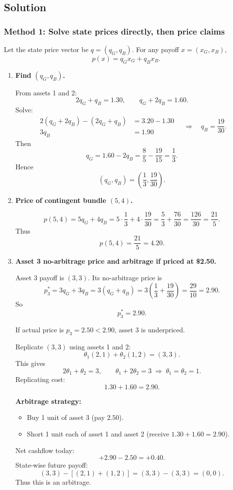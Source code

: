 \documentclass[12pt]{article}
\begin{document}
\bigskip\bigskip

\subsection*{Solution}

\subsubsection*{Method 1: Solve state prices directly, then price claims}

Let the state price vector be \(q=(q_G,q_B)\). For any payoff \(x=(x_G,x_B)\),
\[
p(x)=q_Gx_G+q_Bx_B.
\]

\begin{enumerate}[label=(\alph*)]
\item \textbf{Find \((q_G,q_B)\).}

From assets 1 and 2:
\[
2q_G+q_B=1.30,\qquad q_G+2q_B=1.60.
\]
Solve:
\[
\begin{aligned}
2(q_G+2q_B)-(2q_G+q_B)&=3.20-1.30\\
3q_B&=1.90
\end{aligned}
\quad\Rightarrow\quad
q_B=\frac{19}{30}.
\]
Then
\[
q_G=1.60-2q_B=\frac{8}{5}-\frac{19}{15}=\frac{1}{3}.
\]
Hence
\[
\boxed{(q_G,q_B)=\left(\frac13,\frac{19}{30}\right).}
\]

\item \textbf{Price of contingent bundle \((5,4)\).}

\[
p(5,4)=5q_G+4q_B
=5\cdot \frac13+4\cdot \frac{19}{30}
=\frac{5}{3}+\frac{76}{30}
=\frac{126}{30}
=\frac{21}{5}.
\]
Thus
\[
\boxed{p(5,4)=\frac{21}{5}=4.20.}
\]

\item \textbf{Asset 3 no-arbitrage price and arbitrage if priced at \$2.50.}

Asset 3 payoff is \((3,3)\). Its no-arbitrage price is
\[
p_3^*=3q_G+3q_B=3(q_G+q_B)
=3\left(\frac13+\frac{19}{30}\right)
=\frac{29}{10}=2.90.
\]
So
\[
\boxed{p_3^*=2.90.}
\]

If actual price is \(p_3=2.50<2.90\), asset 3 is underpriced.

Replicate \((3,3)\) using assets 1 and 2:
\[
\theta_1(2,1)+\theta_2(1,2)=(3,3).
\]
This gives
\[
2\theta_1+\theta_2=3,\qquad \theta_1+2\theta_2=3
\;\Rightarrow\; \theta_1=\theta_2=1.
\]
Replicating cost:
\[
1.30+1.60=2.90.
\]

\textbf{Arbitrage strategy:}
\begin{itemize}
\item Buy 1 unit of asset 3 (pay \(2.50\)).
\item Short 1 unit each of asset 1 and asset 2 (receive \(1.30+1.60=2.90\)).
\end{itemize}
Net cashflow today:
\[
+2.90-2.50=\boxed{+0.40}.
\]
State-wise future payoff:
\[
(3,3)-[(2,1)+(1,2)]=(3,3)-(3,3)=(0,0).
\]
Thus this is an arbitrage.
\end{enumerate}
\end{document}
